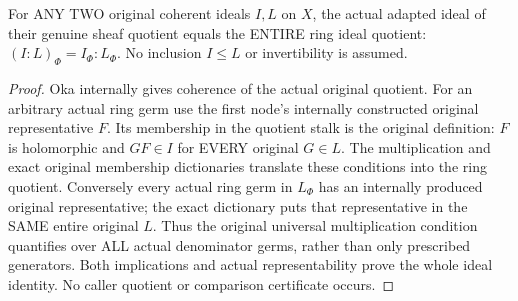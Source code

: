 \begin{theorem}
\label{hir:submersion-germ-colon-original-stalk-quotient}
\leanok
For ANY TWO original coherent ideals $I,L$ on $X$, the actual adapted ideal
of their genuine sheaf quotient equals the ENTIRE ring ideal quotient:
$(I:L)_\Phi=I_\Phi:L_\Phi$. No inclusion $I\le L$ or invertibility is assumed.
\end{theorem}
\begin{proof}
Oka internally gives coherence of the actual original quotient. For an
arbitrary actual ring germ use the first node's internally constructed
original representative $F$. Its membership in the quotient stalk is the
original definition: $F$ is holomorphic and $GF\in I$ for EVERY original
$G\in L$. The multiplication and exact original membership dictionaries
translate these conditions into the ring quotient. Conversely every actual
ring germ in $L_\Phi$ has an internally produced original representative;
the exact dictionary puts that representative in the SAME entire original
$L$. Thus the original universal multiplication condition quantifies over
ALL actual denominator germs, rather than only prescribed generators.
Both implications and actual representability prove the whole ideal
identity. No caller quotient or comparison certificate occurs.
\end{proof}

